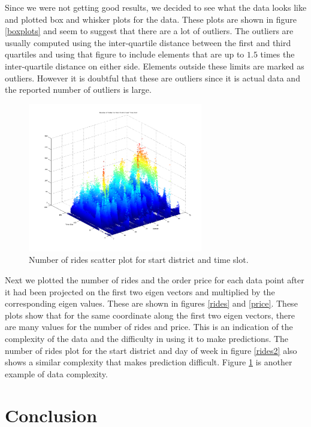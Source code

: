 \documentclass[paper=a4, fontsize=11pt]{scrartcl} %
\numberwithin{equation}{section} %
\numberwithin{table}{section} %
\begin{document}
Since we were not getting good results, we decided to see what the data looks like and plotted box and whisker plots for the data. These plots are shown in figure \ref{boxplots} and seem to suggest that there are a lot of outliers. The outliers are usually computed using the inter-quartile distance between the first and third quartiles and using that figure to include elements that are up to $1.5$ times the inter-quartile distance on either side. Elements outside these limits are marked as outliers. However it is doubtful that these are outliers since it is actual data and the reported number of outliers is large.\\

\begin{figure}[!htb]
\centering
\includegraphics[width=3in]{figures/NumberofRidesforDistrictandTimeSlot.png}
\caption{Number of rides scatter plot for start district and time slot.}
\label{rides3}
\end{figure}

Next we plotted the number of rides and the order price for each data point after it had been projected on the first two eigen vectors and multiplied by the corresponding eigen values. These are shown in figures \ref{rides} and \ref{price}. These plots show that for the same coordinate along the first two eigen vectors, there are many values for the number of rides and price. This is an indication of the complexity of the data and the difficulty in using it to make predictions. The number of rides plot for the start district and day of week in figure \ref{rides2} also shows a similar complexity that makes prediction difficult. Figure \ref{rides3} is another example of data complexity.

\section{Conclusion}
 
\end{document}
